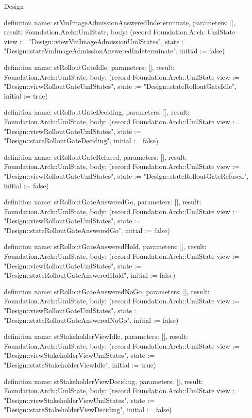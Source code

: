 \begin{lexlean}{Design}
\begin{semanticmodule}
definition{
  name: stVmImageAdmissionAnsweredIndeterminate,
  parameters: [],
  result: Foundation.Arch::UmlState,
  body: (record Foundation.Arch::UmlState {view := "Design::viewVmImageAdmissionUmlStates", state := "Design::stateVmImageAdmissionAnsweredIndeterminate", initial := false})
}

definition{
  name: stRolloutGateIdle,
  parameters: [],
  result: Foundation.Arch::UmlState,
  body: (record Foundation.Arch::UmlState {view := "Design::viewRolloutGateUmlStates", state := "Design::stateRolloutGateIdle", initial := true})
}

definition{
  name: stRolloutGateDeciding,
  parameters: [],
  result: Foundation.Arch::UmlState,
  body: (record Foundation.Arch::UmlState {view := "Design::viewRolloutGateUmlStates", state := "Design::stateRolloutGateDeciding", initial := false})
}

definition{
  name: stRolloutGateRefused,
  parameters: [],
  result: Foundation.Arch::UmlState,
  body: (record Foundation.Arch::UmlState {view := "Design::viewRolloutGateUmlStates", state := "Design::stateRolloutGateRefused", initial := false})
}

definition{
  name: stRolloutGateAnsweredGo,
  parameters: [],
  result: Foundation.Arch::UmlState,
  body: (record Foundation.Arch::UmlState {view := "Design::viewRolloutGateUmlStates", state := "Design::stateRolloutGateAnsweredGo", initial := false})
}

definition{
  name: stRolloutGateAnsweredHold,
  parameters: [],
  result: Foundation.Arch::UmlState,
  body: (record Foundation.Arch::UmlState {view := "Design::viewRolloutGateUmlStates", state := "Design::stateRolloutGateAnsweredHold", initial := false})
}

definition{
  name: stRolloutGateAnsweredNoGo,
  parameters: [],
  result: Foundation.Arch::UmlState,
  body: (record Foundation.Arch::UmlState {view := "Design::viewRolloutGateUmlStates", state := "Design::stateRolloutGateAnsweredNoGo", initial := false})
}

definition{
  name: stStakeholderViewIdle,
  parameters: [],
  result: Foundation.Arch::UmlState,
  body: (record Foundation.Arch::UmlState {view := "Design::viewStakeholderViewUmlStates", state := "Design::stateStakeholderViewIdle", initial := true})
}

definition{
  name: stStakeholderViewDeciding,
  parameters: [],
  result: Foundation.Arch::UmlState,
  body: (record Foundation.Arch::UmlState {view := "Design::viewStakeholderViewUmlStates", state := "Design::stateStakeholderViewDeciding", initial := false})
}


\end{semanticmodule}
\end{lexlean}
